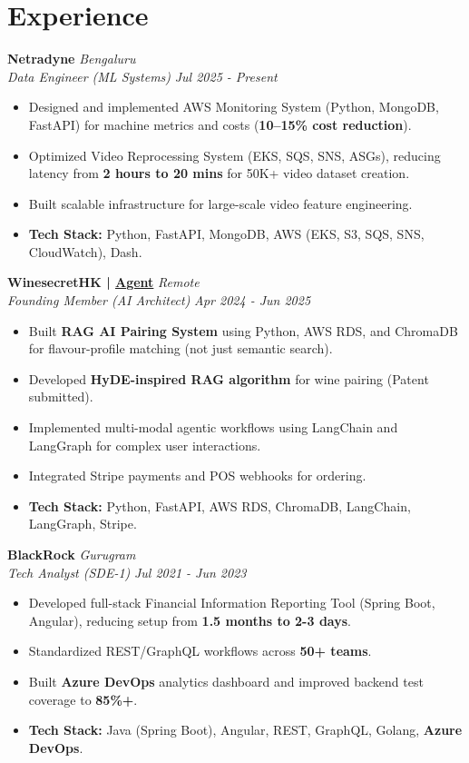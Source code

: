 \documentclass[10pt,a4paper]{article}
\newcommand{\resumeItem}[1]{\item\small{#1}}
\newcommand{\resumeHeading}[4]{
  \vspace{2pt}
  \textbf{#1} \hfill \textit{#2} \\
  \textit{#3} \hfill \textit{#4} \\
}
\begin{document}
\begin{minipage}[t]{0.58\textwidth} %

    \section{Experience}
    
    \resumeHeading{Netradyne}{Bengaluru}{Data Engineer (ML Systems)}{Jul 2025 - Present}
    \begin{itemize}[leftmargin=*, itemsep=1pt, parsep=1pt]
        \resumeItem{Designed and implemented AWS Monitoring System (Python, MongoDB, FastAPI) for machine metrics and costs (\textbf{10--15\% cost reduction}).}
        \resumeItem{Optimized Video Reprocessing System (EKS, SQS, SNS, ASGs), reducing latency from \textbf{2 hours to 20 mins} for 50K+ video dataset creation.}
        \resumeItem{Built scalable infrastructure for large-scale video feature engineering.}
        \resumeItem{\textbf{Tech Stack:} Python, FastAPI, MongoDB, AWS (EKS, S3, SQS, SNS, CloudWatch), Dash.}
    \end{itemize}
    
    \resumeHeading{WinesecretHK \textnormal{| \href{https://rag.winesecrethk.com/static/index.html?client=rizzy\&role=reseller}{Agent}}}{Remote}{Founding Member (AI Architect)}{Apr 2024 - Jun 2025}
    \begin{itemize}[leftmargin=*, itemsep=1pt, parsep=1pt]
        \resumeItem{Built \textbf{RAG AI Pairing System} using Python, AWS RDS, and ChromaDB for flavour-profile matching (not just semantic search).}
        \resumeItem{Developed \textbf{HyDE-inspired RAG algorithm} for wine pairing (Patent submitted).}
        \resumeItem{Implemented multi-modal agentic workflows using LangChain and LangGraph for complex user interactions.}
        \resumeItem{Integrated Stripe payments and POS webhooks for ordering.}
        \resumeItem{\textbf{Tech Stack:} Python, FastAPI, AWS RDS, ChromaDB, LangChain, LangGraph, Stripe.}
    \end{itemize}
    
    \resumeHeading{BlackRock}{Gurugram}{Tech Analyst (SDE-1)}{Jul 2021 - Jun 2023}
    \begin{itemize}[leftmargin=*, itemsep=1pt, parsep=1pt]
        \resumeItem{Developed full-stack Financial Information Reporting Tool (Spring Boot, Angular), reducing setup from \textbf{1.5 months to 2-3 days}.}
        \resumeItem{Standardized REST/GraphQL workflows across \textbf{50+ teams}.}
        \resumeItem{Built \textbf{Azure DevOps} analytics dashboard and improved backend test coverage to \textbf{85\%+}.}
        \resumeItem{\textbf{Tech Stack:} Java (Spring Boot), Angular, REST, GraphQL, Golang, \textbf{Azure DevOps}.}
    \end{itemize}

\end{minipage}
\end{document}
